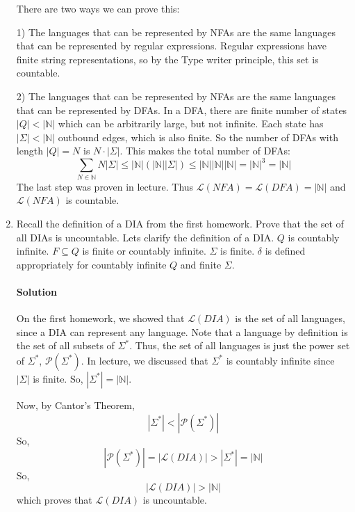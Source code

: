 \documentclass[11pt]{article}
\newcommand{\solution}[1]{\paragraph{Solution}  }
\begin{document}
\begin{enumerate}
    There are two ways we can prove this:

    1) The languages that can be represented by NFAs are the same languages that can be represented by regular expressions. Regular expressions have finite string representations, so by the Type writer principle, this set is countable.

    2) The languages that can be represented by NFAs are the same languages that can be represented by DFAs. In a DFA, there are finite number of states $|Q| < |\mathbb{N}|$ which can be arbitrarily large, but not infinite. Each state has $|\Sigma| < |\mathbb{N}|$ outbound edges, which is also finite. So the number of DFAs with length $|Q| = N$ is $N\cdot|\Sigma|$. This makes the total number of DFAs:
    $$\sum_{N \in \mathbb{N}}N|\Sigma| \leq |\mathbb{N}|(|\mathbb{N}||\Sigma|) \leq |\mathbb{N}||\mathbb{N}||\mathbb{N}| = |\mathbb{N}|^3 = |\mathbb{N}|$$
    The last step was proven in lecture.
    Thus $\mathscr{L}(NFA) = \mathscr{L}(DFA) = |\mathbb{N}|$ and $\mathscr{L}(NFA)$ is countable.

    \newpage
    \item Recall the definition of a DIA from the first homework. Prove that the set of all DIAs is uncountable. Lets clarify the definition of a DIA. $Q$ is countably infinite. $F\subseteq Q$ is finite or countably infinite. $\Sigma$ is finite. $\delta$ is defined appropriately for countably infinite $Q$ and finite $\Sigma$. 

    \solution{} On the first homework, we showed that $\mathscr{L}(DIA)$ is the set of all languages, since a DIA can represent any language. Note that a language by definition is the set of all subsets of $\Sigma^*$. Thus, the set of all languages is just the power set of $\Sigma^*$, $\mathcal{P}(\Sigma^*)$. In lecture, we discussed that $\Sigma^*$ is countably infinite since $|\Sigma|$ is finite. So, $|\Sigma^*| = |\mathbb{N}|$.

    Now, by Cantor's Theorem,
    $$|\Sigma^*| < |\mathcal{P}(\Sigma^*)|$$
    So, 
    $$|\mathcal{P}(\Sigma^*)| = |\mathscr{L}(DIA)| > |\Sigma^*| = |\mathbb{N}|$$
    So,
    $$|\mathscr{L}(DIA)| > |\mathbb{N}|$$
    which proves that $\mathscr{L}(DIA)$ is uncountable.
\end{enumerate} 
\end{document}
